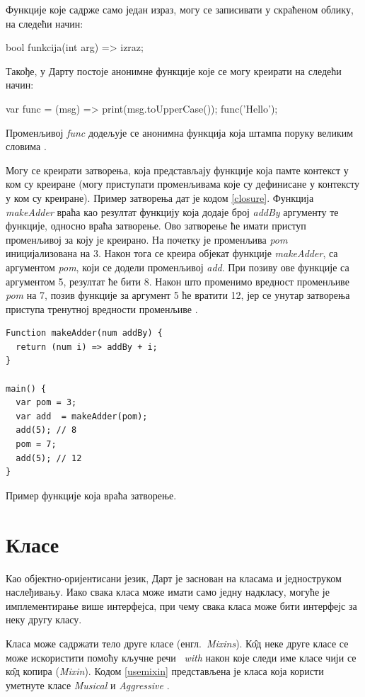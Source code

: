 \documentclass[12pt,oneside]{memoir}
\begin{document}
Функције које садрже само један израз, могу се записивати у скраћеном облику, на следећи начин: 

bool funkcija(int arg) => izraz;

Такође, у Дарту постоје анонимне функције које се могу креирати на следећи начин:  

var func = (msg) => print(msg.toUpperCase());
func('Hello');

Променљивој \textit{func} додељује се анонимна функција која штампа поруку великим словима \cite{dart, dart1}.

Могу се креирати затворења, која представљају функције која памте контекст у ком су креиране (могу приступати променљивама које су дефинисане у контексту у ком су креиране). Пример затворења дат је кодом \ref{closure}. Функција \textit{makeAdder} враћа као резултат функцију која додаје број \textit{addBy} аргументу те функције, односно враћа затворење.  Ово затворење ће имати приступ променљивој за коју је креирано. На почетку је променљива \textit{pom} иницијализована на 3. Након тога се креира објекат функције \textit{makeAdder}, са аргументом \textit{pom}, који се додели променљивој \textit{add}. При позиву ове функције са аргументом 5, резултат ће бити 8. Након што променимо вредност променљиве \textit{pom} на 7, позив функције за аргумент 5 ће вратити 12, јер се унутар затворења приступа тренутној вредности променљиве \cite{dart, dart1}.

\begin{listing}
\begin{verbatim}
Function makeAdder(num addBy) {
  return (num i) => addBy + i;
}

main() {
  var pom = 3;
  var add  = makeAdder(pom);
  add(5); // 8
  pom = 7;
  add(5); // 12
}
\end{verbatim}
\caption{Пример функције која враћа затворење.}
\label{closure}
\end{listing}

\section{Класе}
\label{klase}
Као објектно-оријентисани језик, Дарт је заснован на класама и једноструком наслеђивању. Иако свака класа може имати само једну надкласу, могуће је имплементирање више интерфејса, при чему свака класа може бити интерфејс за неку другу класу. 

Класа може садржати тело друге класе (енгл.~\textit{Mixins}). К\^{о}д неке друге класе се може искористити помоћу кључне речи ~\textit{with} након које следи име класе чији се к\^{о}д копира (\textit{Mixin}). Кодом \ref{usemixin} представљена је класа која користи уметнуте класе \textit{Musical} и \textit{Aggressive} \cite{dart, dart1}.
\end{document}
